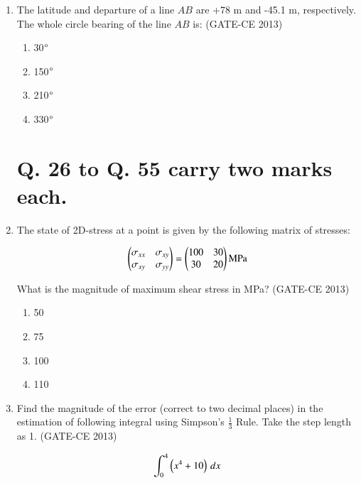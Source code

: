 \documentclass[journal,12pt,onecolumn]{article}
\theoremstyle{remark}
\begin{document}
\begin{enumerate}
    \item The latitude and departure of a line $AB$ are +78 m and -45.1 m, respectively. The whole circle bearing of the line $AB$ is: (GATE-CE 2013)
    \begin{multicols}{4}
    \begin{enumerate}
        \item 30$\degree$ 
        \item 150$\degree$ 
        \item 210$\degree$ 
        \item 330$\degree$
    \end{enumerate}
    \end{multicols}

\section*{Q. 26 to Q. 55 carry two marks each.}

    \item The state of 2D-stress at a point is given by the following matrix of stresses:

    \begin{align}
    \begin{pmatrix}
    \sigma_{xx} & \sigma_{xy} \\
    \sigma_{xy} & \sigma_{yy} \end{pmatrix}
    =
    \begin{pmatrix}
    100 & 30 \\
    30 & 20 \end{pmatrix}
    \text{MPa}
    \end{align}

    What is the magnitude of maximum shear stress in MPa? (GATE-CE 2013)
    \begin{multicols}{4}
    \begin{enumerate}
        \item 50 
        \item 75 
        \item 100 
        \item 110
    \end{enumerate}
    \end{multicols}
    
    \item Find the magnitude of the error (correct to two decimal places) in the estimation of following integral using Simpson's $\frac{1}{3}$ Rule. Take the step length as 1. \underline{\hspace{3cm}} (GATE-CE 2013)

    \begin{align}
    \int_0^4 \left(x^4 + 10\right) \, dx
    \end{align}
    

\end{enumerate}
\end{document}
